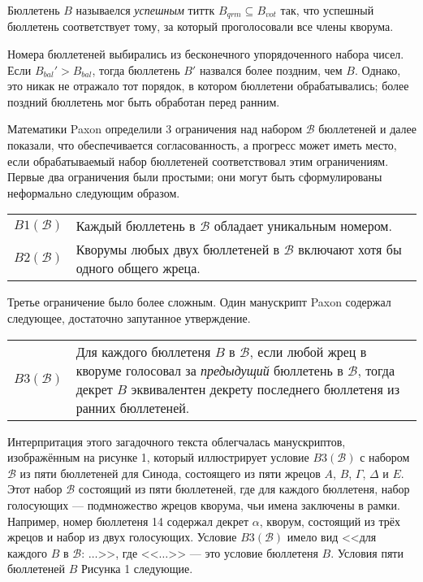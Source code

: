 \documentclass[12pt, a4paper]{article} %
\begin{document}
Бюллетень $B$ называелся \textit{успешным} титтк $B_{qrm} \subseteq B_{vot}$ так, что успешный бюллетень соответствует тому, за который проголосовали все члены кворума.

Номера бюллетеней выбирались из бесконечного упорядоченного набора чисел. Если $B_{bal}' > B_{bal}$, тогда бюллетень $B'$ назвался более поздним, чем $B$. Однако, это никак не отражало тот порядок, в котором бюллетени обрабатывались; более поздний бюллетень мог быть обработан перед ранним.

Математики Paxon определили 3 ограничения над набором $\mathcal{B}$ бюллетеней и далее показали, что обеспечивается согласованность, а прогресс может иметь место, если обрабатываемый набор бюллетеней соответствовал этим ограничениям. Первые два ограничения были простыми; они могут быть сформулированы неформально следующим образом.
\begin{table}[h]
\begin{tabular}{l p{10.5cm}}
    $B1(\mathcal{B})$ & Каждый бюллетень в $\mathcal{B}$ обладает уникальным номером.\\
    $B2(\mathcal{B})$ & Кворумы любых двух бюллетеней в $\mathcal{B}$ включают хотя бы одного общего жреца.
\end{tabular}
\end{table}

Третье ограничение было более сложным. Один манускрипт Paxon содержал следующее, достаточно запутанное утверждение.
\begin{table}[h]
\begin{tabular}{l p{10.5cm}}
    $B3(\mathcal{B})$ & Для каждого бюллетеня $B$ в $\mathcal{B}$, если любой жрец в кворуме голосовал за \textit{предыдущий} бюллетень в $\mathcal{B}$, тогда декрет $B$ эквивалентен декрету последнего бюллетеня из ранних бюллетеней. 
\end{tabular}
\end{table}

Интерпритация этого загадочного текста облегчалась манускриптов, изображённым на рисунке 1, который иллюстрирует условие $B3(\mathcal{B})$ с набором $\mathcal{B}$ из пяти бюллетеней для Синода, состоящего из пяти жрецов $A$, $B$, $\Gamma$, $\Delta$ и $E$. Этот набор $\mathcal{B}$ состоящий из пяти бюллетеней, где для каждого бюллетеня, набор голосующих --- подмножество жрецов кворума, чьи имена заключены в рамки. Например, номер бюллетеня 14 содержал декрет $\alpha$, кворум, состоящий из трёх жрецов и набор из двух голосующих. Условие $B3(\mathcal{B})$ имело вид <<для каждого $B$ в $\mathcal{B}$: $\ldots$>>, где <<$\ldots$>> --- это условие бюллетеня $B$. Условия пяти бюллетеней $B$ Рисунка 1 следующие.
\end{document}
